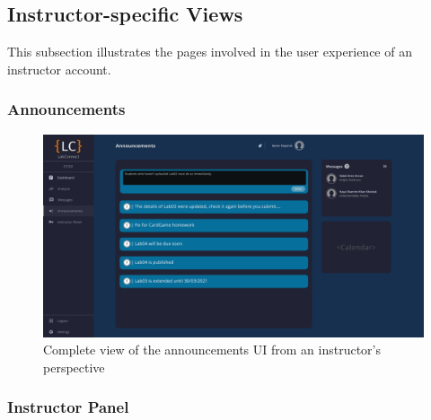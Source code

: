 \documentclass[a4paper, 12pt]{article}
\begin{document}
    
    
    
    
    
    
    
    
    
    \pagebreak
    
    
    \subsection{Instructor-specific Views}
    
    This subsection illustrates the pages involved in the user experience of an instructor account.
    
    \subsubsection{Announcements}
     
    \begin{figure}[H]
        \centering
        \includegraphics[width=\textwidth]{instructor_announcements}
        \caption{Complete view of the announcements UI from an instructor's perspective}
        \label{fig:instructor_announcements_full}
    \end{figure}
    

    
    
    
    
    
    
    
    
    
    
    \pagebreak
    
    \subsubsection{Instructor Panel}
    
\end{document}
